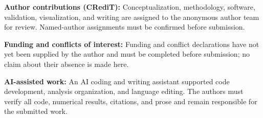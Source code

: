 \documentclass[conference]{IEEEtran}
\begin{document}
\textbf{Author contributions (CRediT):} Conceptualization, methodology,
software, validation, visualization, and writing are assigned to the anonymous
author team for review. Named-author assignments must be confirmed before
submission.

\textbf{Funding and conflicts of interest:} Funding and conflict declarations
have not yet been supplied by the author and must be completed before
submission; no claim about their absence is made here.

\textbf{AI-assisted work:} An AI coding and writing assistant supported code
development, analysis organization, and language editing. The authors must
verify all code, numerical results, citations, and prose and remain responsible
for the submitted work.

\balance


\end{document}

